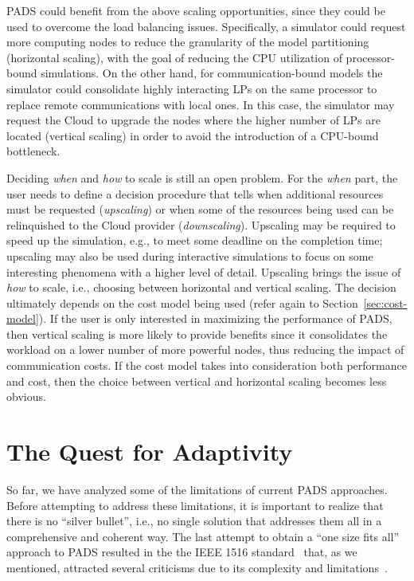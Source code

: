 \documentclass[1p]{elsarticle}
\begin{document}
PADS could benefit from the above scaling opportunities, since they
could be used to overcome the load balancing issues. Specifically, a
simulator could request more computing nodes to reduce the granularity
of the model partitioning (horizontal scaling), with the goal of
reducing the CPU utilization of processor-bound simulations. On the
other hand, for communication-bound models the simulator could
consolidate highly interacting LPs on the same processor to replace
remote communications with local ones. In this case, the simulator may
request the Cloud to upgrade the nodes where the higher number of LPs
are located (vertical scaling) in order to avoid the introduction of a
CPU-bound bottleneck.

Deciding \emph{when} and \emph{how} to scale is still an open
  problem. For the \emph{when} part, the user needs to define a
  decision procedure that tells when additional resources must be
  requested (\emph{upscaling}) or when some of the resources being
  used can be relinquished to the Cloud provider
  (\emph{downscaling}). Upscaling may be required to speed up the
  simulation, e.g., to meet some deadline on the completion time;
  upscaling may also be used during interactive simulations to focus
  on some interesting phenomena with a higher level of
  detail. Upscaling brings the issue of \emph{how} to scale, i.e.,
  choosing between horizontal and vertical scaling. The decision
  ultimately depends on the cost model being used (refer again to
  Section~\ref{sec:cost-model}). If the user is only interested in
  maximizing the performance of PADS, then vertical scaling is more
  likely to provide benefits since it consolidates the workload on a
  lower number of more powerful nodes, thus reducing the impact of
  communication costs. If the cost model takes into consideration both
  performance and cost, then the choice between vertical and
  horizontal scaling becomes less obvious.

\section{The Quest for Adaptivity}\label{sec:artisgaia}

So far, we have analyzed some of the limitations of current PADS
approaches. Before attempting to address these limitations, it is
important to realize that there is no ``silver bullet'', i.e., no
single solution that addresses them all in a comprehensive and
coherent way. The last attempt to obtain a ``one size fits all''
approach to PADS resulted in the the IEEE 1516
standard~\cite{ieee1516} that, as we mentioned, attracted several
criticisms due to its complexity and
limitations~\cite{Davis:1999:HLA:324898.325337,hlainteroperability,4736178,caihlaperformance}.
\end{document}
